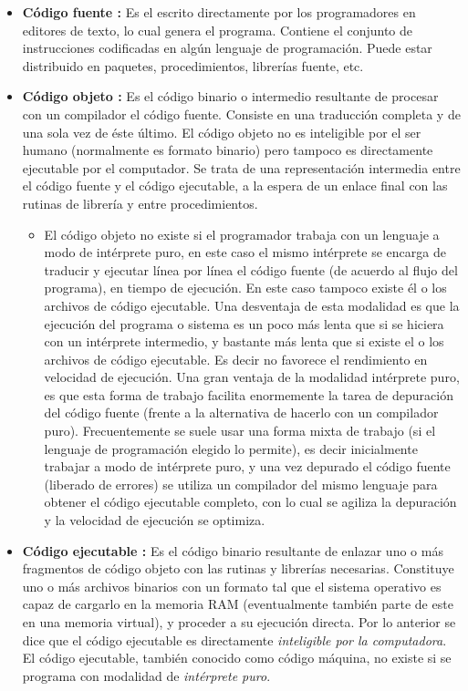 \documentclass[12pt,legalpaper]{report}
\begin{document}
\begin{itemize}

    \item \textbf{Código fuente :} Es el escrito directamente por los programadores en editores de texto, lo cual genera el programa. Contiene el conjunto de instrucciones codificadas en algún lenguaje de programación. Puede estar distribuido en paquetes, procedimientos, librerías fuente, etc.

    \item \textbf{Código objeto :} Es el código binario o intermedio resultante de procesar con un compilador el código fuente. Consiste en una traducción completa y de una sola vez de éste último. El código objeto no es inteligible por el ser humano (normalmente es formato binario) pero tampoco es directamente ejecutable por el computador. Se trata de una representación intermedia entre el código fuente y el código ejecutable, a la espera de un enlace final con las rutinas de librería y entre procedimientos.

	\begin{itemize}
		\item El código objeto no existe si el programador trabaja con un lenguaje a modo de intérprete puro, en este caso el mismo intérprete se encarga de traducir y ejecutar línea por línea el código fuente (de acuerdo al flujo del programa), en tiempo de ejecución. En este caso tampoco existe él o los archivos de código ejecutable. Una desventaja de esta modalidad es que la ejecución del programa o sistema es un poco más lenta que si se hiciera con un intérprete intermedio, y bastante más lenta que si existe el o los archivos de código ejecutable. Es decir no favorece el rendimiento en velocidad de ejecución. Una gran ventaja de la modalidad intérprete puro, es que esta forma de trabajo facilita enormemente la tarea de depuración del código fuente (frente a la alternativa de hacerlo con un compilador puro). Frecuentemente se suele usar una forma mixta de trabajo (si el lenguaje de programación elegido lo permite), es decir inicialmente trabajar a modo de intérprete puro, y una vez depurado el código fuente (liberado de errores) se utiliza un compilador del mismo lenguaje para obtener el código ejecutable completo, con lo cual se agiliza la depuración y la velocidad de ejecución se optimiza.
	\end{itemize}

	\item \textbf{Código ejecutable :} Es el código binario resultante de enlazar uno o más fragmentos de código objeto con las rutinas y librerías necesarias. Constituye uno o más archivos binarios con un formato tal que el sistema operativo es capaz de cargarlo en la memoria RAM (eventualmente también parte de este en una memoria virtual), y proceder a su ejecución directa. Por lo anterior se dice que el código ejecutable es directamente \textit{inteligible por la computadora}. El código ejecutable, también conocido como código máquina, no existe si se programa con modalidad de \textit{intérprete puro}.


\end{itemize}
\end{document}
